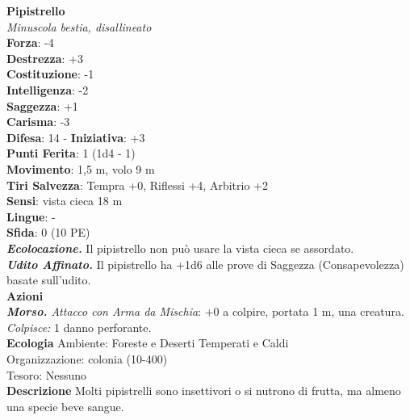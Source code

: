 \begin{multicols}{2}
\medskip\textbf{Pipistrello}\\
\emph{Minuscola bestia, disallineato}\\
\textbf{Forza}: -4\\
\textbf{Destrezza}: +3\\
\textbf{Costituzione}: -1\\
\textbf{Intelligenza}: -2\\
\textbf{Saggezza}: +1\\
\textbf{Carisma}: -3\\
\textbf{Difesa}: 14 - \textbf{Iniziativa}: +3\\
\textbf{Punti Ferita}: 1 (1d4 - 1)\\
\textbf{Movimento}: 1,5 m, volo 9 m\\
\textbf{Tiri Salvezza}: Tempra +0, Riflessi +4, Arbitrio +2 \\
\textbf{Sensi}: vista cieca 18 m \\
\textbf{Lingue}: -\\
\textbf{Sfida}: 0 (10 PE)\smallskip\\
\emph{\textbf{Ecolocazione.}} Il pipistrello non può usare la vista cieca se assordato.\\
\emph{\textbf{Udito Affinato.}} Il pipistrello ha +1d6 alle prove di Saggezza (Consapevolezza) basate sull'udito.\\
\smallskip\textbf{Azioni}\\
\emph{\textbf{Morso.} Attacco con Arma da Mischia}: +0 a colpire, portata 1 m, una creatura.\\
\emph{Colpisce:} 1 danno perforante.\\
\textbf{Ecologia}
Ambiente: Foreste e Deserti Temperati e Caldi\\
Organizzazione: colonia (10-400)\\
Tesoro: Nessuno\\
\textbf{Descrizione}
Molti pipistrelli sono insettivori o si nutrono di frutta, ma almeno una specie beve sangue.\\



\end{multicols}
